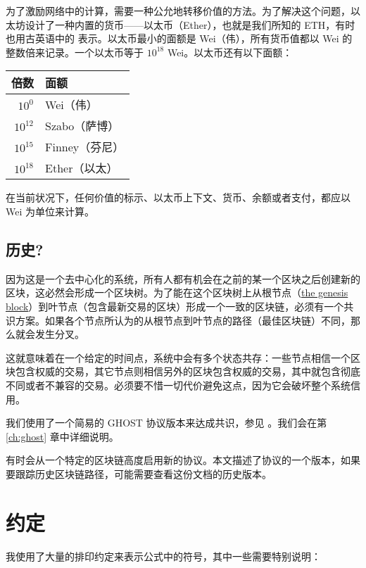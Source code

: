 \documentclass[9pt,oneside]{amsart}
\begin{document}
\begin{multicols}{2}
为了激励网络中的计算，需要一种公允地转移价值的方法。为了解决这个问题，以太坊设计了一种内置的货币——以太币（Ether），也就是我们所知的 {\small ETH}，有时也用古英语中的 \DH{} 表示。以太币最小的面额是 Wei（伟），所有货币值都以 Wei 的整数倍来记录。一个以太币等于 $10^{18}$ Wei。以太币还有以下面额：
\par
\begin{center}
\begin{tabular}{rl}
\toprule
倍数 & 面额 \\
\midrule
$10^0$ & Wei（伟） \\
$10^{12}$ & Szabo（萨博） \\
$10^{15}$ & Finney（芬尼） \\
$10^{18}$ & Ether（以太） \\
\bottomrule
\end{tabular}
\end{center}
\par

在当前状况下，任何价值的标示、以太币上下文、货币、余额或者支付，都应以 Wei 为单位来计算。

\subsection{历史?}

因为这是一个去中心化的系统，所有人都有机会在之前的某一个区块之后创建新的区块，这必然会形成一个区块树。为了能在这个区块树上从根节点（\hyperlink{Genesis_Block}{the genesis block}）到叶节点（包含最新交易的区块）形成一个一致的区块链，必须有一个共识方案。如果各个节点所认为的从根节点到叶节点的路径（最佳区块链）不同，那么就会发生分叉。

这就意味着在一个给定的时间点，系统中会有多个状态共存：一些节点相信一个区块包含权威的交易，其它节点则相信另外的区块包含权威的交易，其中就包含彻底不同或者不兼容的交易。必须要不惜一切代价避免这点，因为它会破坏整个系统信用。

我们使用了一个简易的 GHOST 协议版本来达成共识，参见 \cite{cryptoeprint:2013:881}。我们会在第 \ref{ch:ghost} 章中详细说明。

有时会从一个特定的区块链高度启用新的协议。本文描述了协议的一个版本，如果要跟踪历史区块链路径，可能需要查看这份文档的历史版本。

\section{约定}\label{ch:conventions}

我使用了大量的排印约定来表示公式中的符号，其中一些需要特别说明：


\end{multicols}
\end{document}
